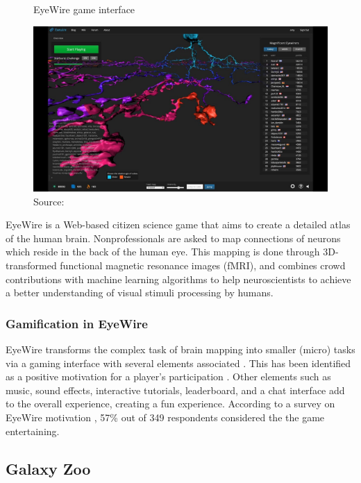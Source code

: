 \begin{figure}[ht]
    \centering
    \caption{EyeWire game interface}
    \includegraphics[width=0.8\linewidth]{images/background/eyewire.jpg}
    \caption*{Source: \cite{eyewire2014how}}
    \label{fig:eyewire-game-interface}
\end{figure}

EyeWire is a Web-based citizen science game that aims to create a detailed atlas of the human brain. Nonprofessionals are asked to map connections of neurons which reside in the back of the human eye. This mapping is done through 3D-transformed functional magnetic resonance images (fMRI), and combines crowd contributions with machine learning algorithms to help neuroscientists to achieve a better understanding of visual stimuli processing by humans.

\subsubsection{Gamification in EyeWire}

EyeWire transforms the complex task of brain mapping into smaller (micro) tasks via a gaming interface with several elements associated \cite{seaborn2015gamification}. This has been identified as a positive motivation for a player's participation \cite{tinati2016because}. Other elements such as music, sound effects, interactive tutorials, leaderboard, and a chat interface add to the overall experience, creating a fun experience. According to a survey on EyeWire motivation \cite{tinati2016because}, 57\% out of 349 respondents considered the the game entertaining.

\subsection{Galaxy Zoo}

